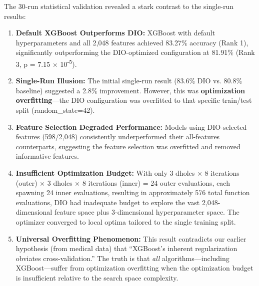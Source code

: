 \documentclass[12pt, a4paper]{article}
\begin{document}
The 30-run statistical validation revealed a stark contrast to the single-run results:

\begin{enumerate}
    \item \textbf{Default XGBoost Outperforms DIO:} XGBoost with default hyperparameters and all 2,048 features achieved 83.27\% accuracy (Rank 1), significantly outperforming the DIO-optimized configuration at 81.91\% (Rank 3, p = 7.15 × 10\textsuperscript{-5}).
    
    \item \textbf{Single-Run Illusion:} The initial single-run result (83.6\% DIO vs. 80.8\% baseline) suggested a 2.8\% improvement. However, this was \textbf{optimization overfitting}—the DIO configuration was overfitted to that specific train/test split (random\_state=42).
    
    \item \textbf{Feature Selection Degraded Performance:} Models using DIO-selected features (598/2,048) consistently underperformed their all-features counterparts, suggesting the feature selection was overfitted and removed informative features.
    
    \item \textbf{Insufficient Optimization Budget:} With only 3 dholes × 8 iterations (outer) × 3 dholes × 8 iterations (inner) = 24 outer evaluations, each spawning 24 inner evaluations, resulting in approximately 576 total function evaluations, DIO had inadequate budget to explore the vast 2,048-dimensional feature space plus 3-dimensional hyperparameter space. The optimizer converged to local optima tailored to the single training split.
    
    \item \textbf{Universal Overfitting Phenomenon:} This result contradicts our earlier hypothesis (from medical data) that ``XGBoost's inherent regularization obviates cross-validation.'' The truth is that \emph{all} algorithms—including XGBoost—suffer from optimization overfitting when the optimization budget is insufficient relative to the search space complexity.
\end{enumerate}
\end{document}
